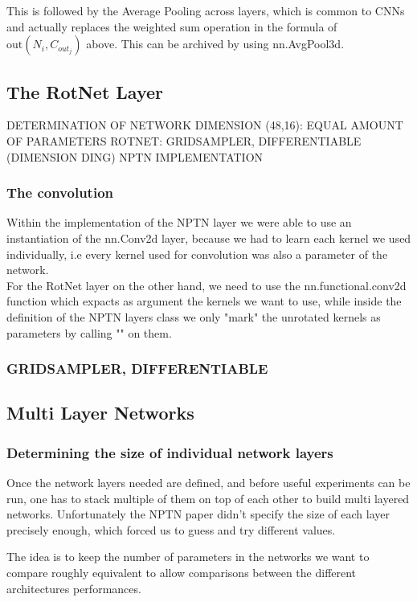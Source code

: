 \documentclass{llncs}
\begin{document}
This is followed by the Average Pooling across layers, which is common to CNNs and actually replaces the weighted sum operation in the formula of $\text{out}(N_i, C_{out_j})$ above. This can be archived by using nn.AvgPool3d.

\subsection{The RotNet Layer}
DETERMINATION OF NETWORK DIMENSION (48,16): EQUAL AMOUNT
OF PARAMETERS
ROTNET: GRIDSAMPLER, DIFFERENTIABLE
(DIMENSION DING)
NPTN IMPLEMENTATION

\subsubsection{The convolution}
Within the implementation of the NPTN layer we were able to use an instantiation of the nn.Conv2d layer, because we had to learn each kernel we used individually, i.e every kernel used for convolution was also a parameter of the network.\\
For the RotNet layer on the other hand, we need to use the nn.functional.conv2d function which expacts as argument the kernels we want to use, while inside the definition of the NPTN layers class we only "mark" the unrotated kernels as parameters by calling "" on them.

\subsubsection{GRIDSAMPLER, DIFFERENTIABLE}

\subsection{Multi Layer Networks}
\subsubsection{Determining the size of individual network layers}
Once the network layers needed are defined, and before useful experiments can be run, one has to stack multiple of them on top of each other to build multi layered networks.
Unfortunately the NPTN paper didn't specify the size of each layer precisely enough, which forced us to guess and try different values.

The idea is to keep the number of parameters in the networks we want to compare roughly equivalent to allow comparisons between the different architectures performances.
\end{document}
